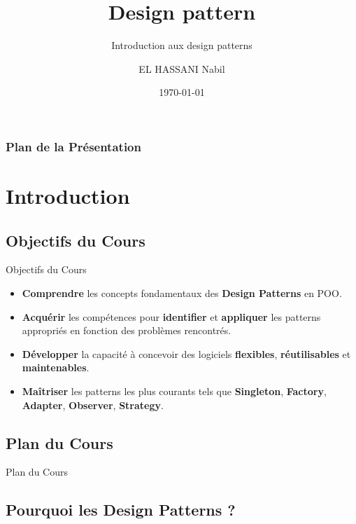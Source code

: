 \documentclass[aspectratio=169]{beamer}
\author{EL HASSANI Nabil}
\title{Design pattern}
\subtitle{Introduction aux design patterns}
\institute{
    Efrei \\
    Université Paris Panthéon-Assas
    }
\date{\small \today}
\begin{document}
\begin{frame}
    \titlepage
\end{frame}

\begin{frame}
    \frametitle{Plan de la Présentation}
    \tableofcontents[hideallsubsections]
\end{frame}

\section{Introduction}

\subsection{Objectifs du Cours}

\begin{frame}{Objectifs du Cours}
    \begin{itemize}
        \item \textbf{Comprendre} les concepts fondamentaux des \textbf{Design Patterns} en POO.
        \item \textbf{Acquérir} les compétences pour \textbf{identifier} et \textbf{appliquer} les patterns appropriés en fonction des problèmes rencontrés.
        \item \textbf{Développer} la capacité à concevoir des logiciels \textbf{flexibles}, \textbf{réutilisables} et \textbf{maintenables}.
        \item \textbf{Maîtriser} les patterns les plus courants tels que \textbf{Singleton}, \textbf{Factory}, \textbf{Adapter}, \textbf{Observer}, \textbf{Strategy}.
    \end{itemize}
\end{frame}

\subsection{Plan du Cours}

\begin{frame}{Plan du Cours}
    \tableofcontents
\end{frame}

\subsection{Pourquoi les Design Patterns ?}
\end{document}
